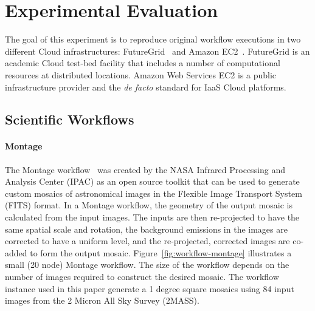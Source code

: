 \section{Experimental Evaluation}
\label{sec:experiment}

The goal of this experiment is to reproduce original workflow executions in two different 
Cloud infrastructures: FutureGrid~\cite{futuregrid} and Amazon EC2~\cite{aws}. 
FutureGrid is an academic Cloud test-bed facility that includes a number of computational 
resources at distributed locations. Amazon Web Services EC2 is a public infrastructure 
provider and the \emph{de facto} standard for IaaS Cloud platforms.


\subsection{Scientific Workflows}

\paragraph{\textbf{Montage}}
The Montage workflow~\cite{Montage} was created by the NASA Infrared Processing 
and Analysis Center (IPAC) as an open source toolkit that can be used to generate 
custom mosaics of astronomical images in the Flexible Image Transport System (FITS) 
format. In a Montage workflow, the geometry of the output mosaic is calculated from the 
input images. The inputs are then re-projected to have the same spatial scale and rotation, 
the background emissions in the images are corrected to have a uniform level, and the 
re-projected, corrected images are co-added to form the output mosaic. 
Figure~\ref{fig:workflow-montage} illustrates a small (20 node) Montage workflow. The 
size of the workflow depends on the number of images required to construct the desired 
mosaic. The workflow instance used in this paper generate a 1 degree square mosaics 
using 84 input images from the 2 Micron All Sky Survey (2MASS).

